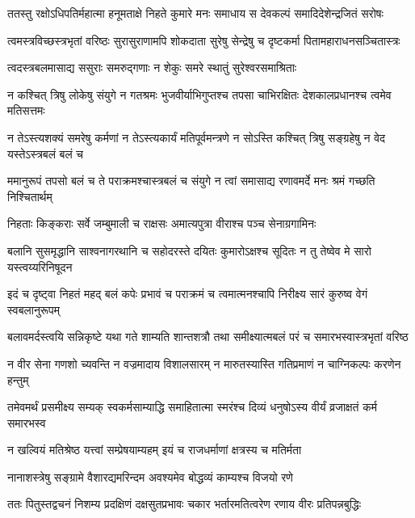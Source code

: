 
\twolineshloka
{ततस्तु रक्षोऽधिपतिर्महात्मा हनूमताक्षे निहते कुमारे}
{मनः समाधाय स देवकल्पं समादिदेशेन्द्रजितं सरोषः} %

\twolineshloka
{त्वमस्त्रविच्छस्त्रभृतां वरिष्ठः सुरासुराणामपि शोकदाता}
{सुरेषु सेन्द्रेषु च दृष्टकर्मा पितामहाराधनसञ्चितास्त्रः} %

\twolineshloka
{त्वदस्त्रबलमासाद्य ससुराः समरुद्गणाः}
{न शेकुः समरे स्थातुं सुरेश्वरसमाश्रिताः} %

\threelineshloka
{न कश्चित् त्रिषु लोकेषु संयुगे न गतश्रमः}
{भुजवीर्याभिगुप्तश्च तपसा चाभिरक्षितः}
{देशकालप्रधानश्च त्वमेव मतिसत्तमः} %

\twolineshloka
{न तेऽस्त्यशक्यं समरेषु कर्मणां न तेऽस्त्यकार्यं मतिपूर्वमन्त्रणे}
{न सोऽस्ति कश्चित् त्रिषु सङ्ग्रहेषु न वेद यस्तेऽस्त्रबलं बलं च} %

\twolineshloka
{ममानुरूपं तपसो बलं च ते पराक्रमश्चास्त्रबलं च संयुगे}
{न त्वां समासाद्य रणावमर्दे मनः श्रमं गच्छति निश्चितार्थम्} %

\twolineshloka
{निहताः किङ्कराः सर्वे जम्बुमाली च राक्षसः}
{अमात्यपुत्रा वीराश्च पञ्च सेनाग्रगामिनः} %

\threelineshloka
{बलानि सुसमृद्धानि साश्वनागरथानि च}
{सहोदरस्ते दयितः कुमारोऽक्षश्च सूदितः}
{न तु तेष्वेव मे सारो यस्त्वय्यरिनिषूदन} %

\twolineshloka
{इदं च दृष्ट्वा निहतं महद् बलं कपेः प्रभावं च पराक्रमं च}
{त्वमात्मनश्चापि निरीक्ष्य सारं कुरुष्व वेगं स्वबलानुरूपम्} %

\twolineshloka
{बलावमर्दस्त्वयि सन्निकृष्टे यथा गते शाम्यति शान्तशत्रौ}
{तथा समीक्ष्यात्मबलं परं च समारभस्वास्त्रभृतां वरिष्ठ} %

\twolineshloka
{न वीर सेना गणशो च्यवन्ति न वज्रमादाय विशालसारम्}
{न मारुतस्यास्ति गतिप्रमाणं न चाग्निकल्पः करणेन हन्तुम्} %

\twolineshloka
{तमेवमर्थं प्रसमीक्ष्य सम्यक् स्वकर्मसाम्याद्धि समाहितात्मा}
{स्मरंश्च दिव्यं धनुषोऽस्य वीर्यं व्रजाक्षतं कर्म समारभस्व} %

\twolineshloka
{न खल्वियं मतिश्रेष्ठ यत्त्वां सम्प्रेषयाम्यहम्}
{इयं च राजधर्माणां क्षत्रस्य च मतिर्मता} %

\twolineshloka
{नानाशस्त्रेषु सङ्ग्रामे वैशारद्यमरिन्दम}
{अवश्यमेव बोद्धव्यं काम्यश्च विजयो रणे} %

\twolineshloka
{ततः पितुस्तद्वचनं निशम्य प्रदक्षिणं दक्षसुतप्रभावः}
{चकार भर्तारमतित्वरेण रणाय वीरः प्रतिपन्नबुद्धिः} %


